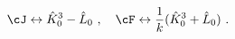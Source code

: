 \begin{equation}
 \cJ \leftrightarrow \hat{K}^3_0-\hat{L}_0~,~~~
 \cF \leftrightarrow \frac{1}{k} (\hat{K}^3_0+\hat{L}_0)~.
\label{JandF}
\end{equation}

